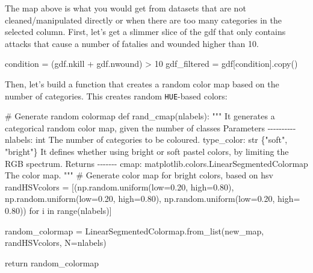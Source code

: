 \documentclass[
  letterpaper,
  DIV=11,
  numbers=noendperiod]{scrreprt}
\newenvironment{Shaded}{\begin{snugshade}}{\end{snugshade}}
\newcommand{\BuiltInTok}[1]{\textcolor[rgb]{0.00,0.23,0.31}{#1}}
\newcommand{\CommentTok}[1]{\textcolor[rgb]{0.37,0.37,0.37}{#1}}
\newcommand{\ControlFlowTok}[1]{\textcolor[rgb]{0.00,0.23,0.31}{#1}}
\newcommand{\DecValTok}[1]{\textcolor[rgb]{0.68,0.00,0.00}{#1}}
\newcommand{\FloatTok}[1]{\textcolor[rgb]{0.68,0.00,0.00}{#1}}
\newcommand{\KeywordTok}[1]{\textcolor[rgb]{0.00,0.23,0.31}{#1}}
\newcommand{\NormalTok}[1]{\textcolor[rgb]{0.00,0.23,0.31}{#1}}
\newcommand{\OperatorTok}[1]{\textcolor[rgb]{0.37,0.37,0.37}{#1}}
\newcommand{\StringTok}[1]{\textcolor[rgb]{0.13,0.47,0.30}{#1}}
\begin{document}
The map above is what you would get from datasets that are not
cleaned/manipulated directly or when there are too many categories in
the selected column. First, let's get a slimmer slice of the gdf that
only contains attacks that cause a number of fatalies and wounded higher
than 10.

\begin{Shaded}
\begin{Highlighting}[]
\NormalTok{condition }\OperatorTok{=}\NormalTok{ (gdf.nkill }\OperatorTok{+}\NormalTok{ gdf.nwound) }\OperatorTok{\textgreater{}} \DecValTok{10}
\NormalTok{gdf\_filtered }\OperatorTok{=}\NormalTok{ gdf[condition].copy()}
\end{Highlighting}
\end{Shaded}

Then, let's build a function that creates a random color map based on
the number of categories. This creates random \texttt{HUE}-based colors:

\begin{Shaded}
\begin{Highlighting}[]
\CommentTok{\# Generate random colormap}
\KeywordTok{def}\NormalTok{ rand\_cmap(nlabels):}
    \CommentTok{""" }
\CommentTok{    It generates a categorical random color map, given the number of classes}
\CommentTok{    }
\CommentTok{    Parameters}
\CommentTok{    {-}{-}{-}{-}{-}{-}{-}{-}{-}{-}}
\CommentTok{    nlabels: int}
\CommentTok{        The number of categories to be coloured.}
\CommentTok{    type\_color: str \{"soft", "bright"\} }
\CommentTok{        It defines whether using bright or soft pastel colors, by limiting the RGB spectrum.}
\CommentTok{       }
\CommentTok{    Returns}
\CommentTok{    {-}{-}{-}{-}{-}{-}{-}}
\CommentTok{    cmap: matplotlib.colors.LinearSegmentedColormap}
\CommentTok{        The color map.}
\CommentTok{    """}   
    \CommentTok{\# Generate color map for bright colors, based on hsv}
\NormalTok{    randHSVcolors }\OperatorTok{=}\NormalTok{ [(np.random.uniform(low}\OperatorTok{=}\FloatTok{0.20}\NormalTok{, high}\OperatorTok{=}\FloatTok{0.80}\NormalTok{),}
\NormalTok{                          np.random.uniform(low}\OperatorTok{=}\FloatTok{0.20}\NormalTok{, high}\OperatorTok{=}\FloatTok{0.80}\NormalTok{),}
\NormalTok{                          np.random.uniform(low}\OperatorTok{=}\FloatTok{0.20}\NormalTok{, high}\OperatorTok{=} \FloatTok{0.80}\NormalTok{)) }\ControlFlowTok{for}\NormalTok{ i }\KeywordTok{in} \BuiltInTok{range}\NormalTok{(nlabels)]}

\NormalTok{    random\_colormap }\OperatorTok{=}\NormalTok{ LinearSegmentedColormap.from\_list(}\StringTok{\textquotesingle{}new\_map\textquotesingle{}}\NormalTok{, randHSVcolors, N}\OperatorTok{=}\NormalTok{nlabels)}
   
    \ControlFlowTok{return}\NormalTok{ random\_colormap }
\end{Highlighting}
\end{Shaded}
\end{document}
